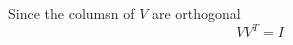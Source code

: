 \markdownRendererInterblockSeparator
{}Since the columsn of $V$ are orthogonal\markdownRendererEllipsis{}\markdownRendererInterblockSeparator
{}$$VV^T=I$$\relax
